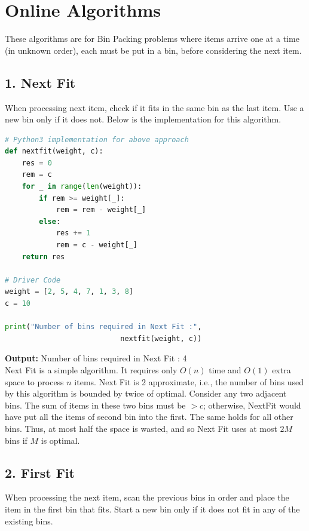 \documentclass[runningheads]{llncs}
\begin{document}
\section{Online Algorithms}
These algorithms are for Bin Packing problems where items arrive one at a time (in unknown order), each must be put in a bin, before considering the next item.

\subsection{1. Next Fit}
When processing next item, check if it fits in the same bin as the last item. Use a new bin only if it does not. Below is the implementation for this algorithm.

\begin{tcolorbox}[BoxBlue, title=\faIcon{code} Next Fit Implementation, fonttitle=\bfseries]
\begin{lstlisting}[language=Python]
# Python3 implementation for above approach
def nextfit(weight, c):
    res = 0
    rem = c
    for _ in range(len(weight)):
        if rem >= weight[_]:
            rem = rem - weight[_]
        else:
            res += 1
            rem = c - weight[_]
    return res

# Driver Code
weight = [2, 5, 4, 7, 1, 3, 8]
c = 10

print("Number of bins required in Next Fit :", 
                           nextfit(weight, c))

\end{lstlisting}
\end{tcolorbox}

\textbf{Output:} Number of bins required in Next Fit : 4 \\
Next Fit is a simple algorithm. It requires only $O(n)$ time and $O(1)$ extra space to process $n$ items. Next Fit is 2 approximate, i.e., the number of bins used by this algorithm is bounded by twice of optimal. Consider any two adjacent bins. The sum of items in these two bins must be $> c$; otherwise, NextFit would have put all the items of second bin into the first. The same holds for all other bins. Thus, at most half the space is wasted, and so Next Fit uses at most $2M$ bins if $M$ is optimal.

\subsection{2. First Fit}
When processing the next item, scan the previous bins in order and place the item in the first bin that fits. Start a new bin only if it does not fit in any of the existing bins.
\end{document}
